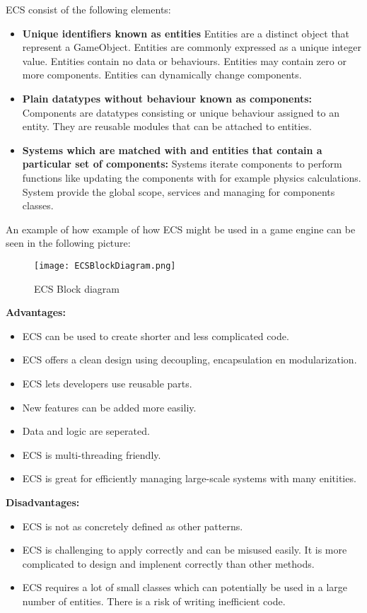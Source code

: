 \noindent ECS consist of the following elements:
\begin{itemize}
      \item \textbf{Unique identifiers known as entities}
            Entities are a distinct object that represent a GameObject.
            Entities are commonly expressed as a unique integer value.
            Entities contain no data or behaviours.
            Entities may contain zero or more components.
            Entities can dynamically change components.
      \item \textbf{Plain datatypes without behaviour known as components:}
            Components are datatypes consisting or unique behaviour assigned to an entity.
            They are reusable modules that can be attached to entities.
      \item \textbf{Systems which are matched with and entities that contain a particular set of components:}
            Systems iterate components to perform functions like updating the components with for example physics calculations.
            System provide the global scope, services and managing for components classes.
\end{itemize}

\noindent An example of how example of how ECS might be used in a game engine can be seen in the following picture:
\begin{figure}[h!]
      \centering
      \texttt{[image: ECSBlockDiagram.png]}
      \caption{ECS Block diagram}
      \label{fig:ECSBLockDiagram}
\end{figure}
\newpage

\noindent \textbf{Advantages:}
\begin{itemize}
      \item ECS can be used to create shorter and less complicated code.
      \item ECS offers a clean design using decoupling, encapsulation en modularization.
      \item ECS lets developers use reusable parts.
      \item New features can be added more easiliy.
      \item Data and logic are seperated.
      \item ECS is multi-threading friendly.
      \item ECS is great for efficiently managing large-scale systems with many enitities.
\end{itemize}

\noindent \textbf{Disadvantages:}
\begin{itemize}
      \item ECS is not as concretely defined as other patterns.
      \item ECS is challenging to apply correctly and can be misused easily. It is more complicated to design and implenent correctly than other methods.
      \item ECS requires a lot of small classes which can potentially be used in a large number of entities. There is a risk of writing inefficient code.
\end{itemize}
\cite{simplilearn}

